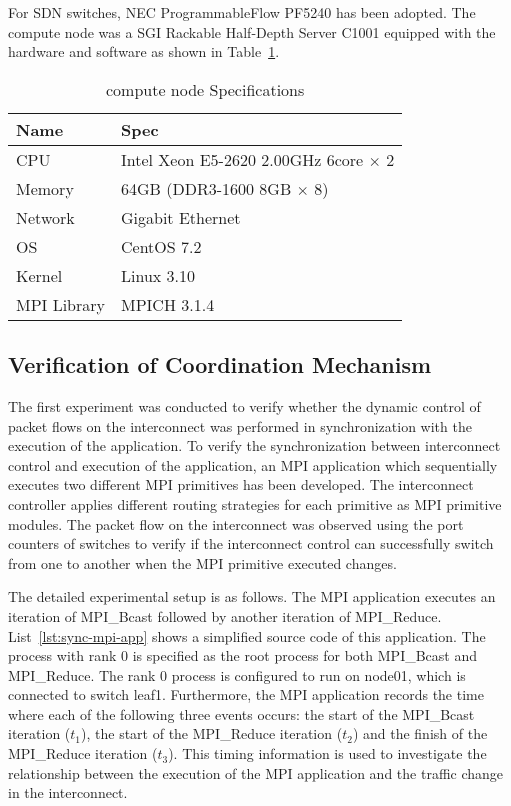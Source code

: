 For SDN switches, NEC ProgrammableFlow PF5240 has been adopted. The compute
node was a SGI Rackable Half-Depth Server C1001 equipped with the hardware and
software as shown in Table~\ref{tbl:node-spec}.

\begin{table}
    \centering
    \caption{compute node Specifications}%
    \label{tbl:node-spec}
    \begin{tabular}{ll}
        \toprule
        Name        & Spec                                        \\ \midrule
        CPU         & Intel Xeon E5-2620 2.00GHz 6core $\times$ 2 \\
        Memory      & 64GB (DDR3-1600 8GB $\times$ 8)             \\
        Network     & Gigabit Ethernet                            \\
        OS          & CentOS 7.2                                  \\
        Kernel      & Linux 3.10                                  \\
        MPI Library & MPICH 3.1.4                                 \\ \bottomrule
    \end{tabular}
\end{table}

\subsection{Verification of Coordination Mechanism}

The first experiment was conducted to verify whether the dynamic control
of packet flows on the interconnect was performed in synchronization
with the execution of the application. To verify the synchronization
between interconnect control and execution of the application, an MPI
application which sequentially executes two different MPI primitives has
been developed. The interconnect controller applies different routing
strategies for each primitive as MPI primitive modules. The packet flow on the
interconnect was observed using the port counters of switches to verify if the
interconnect control can successfully switch from one to another when the MPI
primitive executed changes.

The detailed experimental setup is as follows. The MPI application
executes an iteration of MPI\_Bcast followed by another iteration of
MPI\_Reduce. List~\ref{lst:sync-mpi-app} shows a simplified source code
of this application. The process with rank 0 is specified as the root
process for both MPI\_Bcast and MPI\_Reduce. The rank 0 process is
configured to run on node01, which is connected to switch leaf1.
Furthermore, the MPI application records the time where each of the
following three events occurs: the start of the MPI\_Bcast iteration
(\(t_1\)), the start of the MPI\_Reduce iteration (\(t_2\)) and the
finish of the MPI\_Reduce iteration (\(t_3\)). This timing information
is used to investigate the relationship between the execution of the MPI
application and the traffic change in the interconnect.

